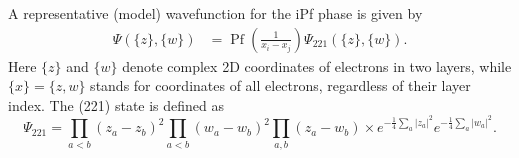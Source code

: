 A representative (model) wavefunction for the iPf phase is given by~\cite{Ardonne02}
\begin{align}
	\Psi( \{z\}, \{w\}) &= \operatorname{Pf}\left( \frac{1}{x_i-x_j} \right) \Psi_{221}(\{z\},\{w\}).		\label{ipfwf}
\end{align}
Here $\{z\}$ and $\{w\}$ denote complex 2D coordinates of electrons in two layers, while $\{x\}=\{z,w\}$ stands for coordinates of all electrons, regardless of their layer index.
The (221) state is defined as
\begin{equation}
	\Psi_{221} = \prod_{a<b} (z_a - z_b)^2 \prod_{a<b} (w_a - w_b)^2  \prod_{a,b} (z_a - w_b)	
		 \times e^{ -\frac14 \sum_a |z_a|^2 } e^{ -\frac14 \sum_a |w_a|^2 } .
\end{equation}
%
%

